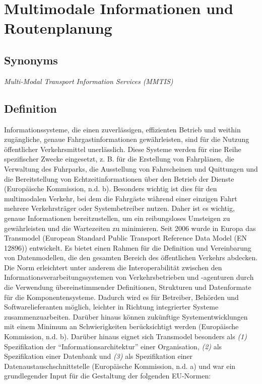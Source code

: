 \documentclass[
]{book}
\begin{document}
\hypertarget{info_and_route_planning}{%
\section{Multimodale Informationen und Routenplanung}\label{info_and_route_planning}}

\hypertarget{synonyms}{%
\subsection*{Synonyms}\label{synonyms}}

\emph{Multi-Modal Transport Information Services (MMTIS)}

\hypertarget{definition-21}{%
\subsection*{Definition}\label{definition-21}}

Informationssysteme, die einen zuverlässigen, effizienten Betrieb und weithin zugängliche, genaue Fahrgastinformationen gewährleisten, sind für die Nutzung öffentlicher Verkehrsmittel unerlässlich. Diese Systeme werden für eine Reihe spezifischer Zwecke eingesetzt, z. B. für die Erstellung von Fahrplänen, die Verwaltung des Fuhrparks, die Ausstellung von Fahrscheinen und Quittungen und die Bereitstellung von Echtzeitinformationen über den Betrieb der Dienste (Europäische Kommission, n.d. b). Besonders wichtig ist dies für den multimodalen Verkehr, bei dem die Fahrgäste während einer einzigen Fahrt mehrere Verkehrsträger oder Systembetreiber nutzen. Daher ist es wichtig, genaue Informationen bereitzustellen, um ein reibungsloses Umsteigen zu gewährleisten und die Wartezeiten zu minimieren.
Seit 2006 wurde in Europa das Transmodel (European Standard Public Transport Reference Data Model (EN 12896)) entwickelt. Es bietet einen Rahmen für die Definition und Vereinbarung von Datenmodellen, die den gesamten Bereich des öffentlichen Verkehrs abdecken. Die Norm erleichtert unter anderem die Interoperabilität zwischen den Informationsverarbeitungssystemen von Verkehrsbetrieben und -agenturen durch die Verwendung übereinstimmender Definitionen, Strukturen und Datenformate für die Komponentensysteme. Dadurch wird es für Betreiber, Behörden und Softwarelieferanten möglich, leichter in Richtung integrierter Systeme zusammenzuarbeiten. Darüber hinaus können zukünftige Systementwicklungen mit einem Minimum an Schwierigkeiten berücksichtigt werden (Europäische Kommission, n.d. b). Darüber hinaus eignet sich Transmodel besonders als \emph{(1)} Spezifikation der ``Informationsarchitektur'' einer Organisation, \emph{(2)} als Spezifikation einer Datenbank und \emph{(3)} als Spezifikation einer Datenaustauschschnittstelle (Europäische Kommission, n.d. a) und war ein grundlegender Input für die Gestaltung der folgenden EU-Normen:
\end{document}

